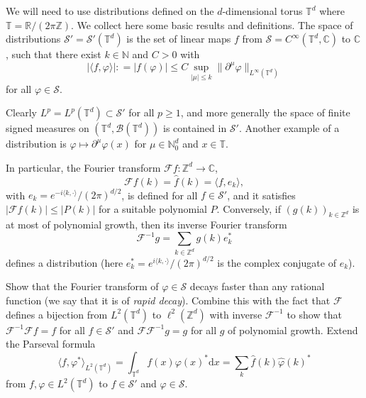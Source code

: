 \documentclass[a4paper,11pt]{article}
\newcommand{\cdummy}{\cdot}
\newcommand{\mathd}{\mathrm{d}}
\newcommand{\tmtextit}[1]{{\itshape{#1}}}
\newcommand{\CB}{\mathscr{B}}
\newcommand{\CF}{\mathscr{F}}
\newcommand{\CS}{\mathscr{S}}
\begin{document}
We will need to use distributions defined on the $d$-dimensional torus $\mathbb{T}^d$ where $\mathbb{T}=\mathbb{R}/ (2 \pi \mathbb{Z})$. We collect here some basic results and definitions. The space of distributions $\CS' = \CS' (\mathbb{T}^d)$ is the set of linear
maps $f$ from $\CS = C^{\infty} (\mathbb{T}^d, \mathbb{C})$ to
$\mathbb{C}$, such that there exist $k \in \mathbb{N}$ and $C > 0$ with
\[ | \langle f, \varphi \rangle | : = | f (\varphi) | \leqslant C \sup_{|
   {\mu} | \leqslant k} \| \partial^{{\mu}} \varphi \|_{L^{\infty}
   (\mathbb{T}^d)} \]
for all $\varphi \in \CS$.

\begin{example}
  Clearly $L^p = L^p (\mathbb{T}^d) \subset \CS'$ for all $p \geqslant 1$,
  and more generally the space of finite signed measures on $(\mathbb{T}^d, \mathcal{\CB} (\mathbb{T}^d))$ is contained in
  $\CS'$. Another example of a distribution is $\varphi \mapsto
  \partial^{{\mu}} \varphi (x)$ for ${\mu} \in \mathbb{N}^d_0$ and $x
  \in \mathbb{T}$.
\end{example}

In particular, the Fourier transform $\CF f : \mathbb{Z}^d \rightarrow
\mathbb{C}$,
\[ \CF f (k) = \hat{f} (k) = \langle f, e_k \rangle, \]
with $e_k = e^{- i \langle k, \cdummy \rangle} / (2 \pi)^{d / 2}$, is defined
for all $f \in \CS'$, and it satisfies $| \CF f (k) | \leqslant | P
(k) |$ for a suitable polynomial $P$. Conversely, if $(g (k))_{k \in
\mathbb{Z}^d}$ is at most of polynomial growth, then its inverse Fourier
transform
\[ \CF^{- 1} g = \sum_{k \in \mathbb{Z}^d} g (k) e_k^{\ast} \]
defines a distribution (here $e_k^\ast = e^{i \langle k, \cdummy \rangle} / (2 \pi)^{d / 2}$ is the complex conjugate of $e_k$).

\begin{exercise}
  \label{exo:fourier inversion}Show that the Fourier transform of $\varphi \in
  \CS$ decays faster than any rational function (we say that it is of
  \tmtextit{rapid decay}). Combine this with the fact that $\CF$ defines a
  bijection from $L^2 (\mathbb{T}^d)$ to $\ell^2 (\mathbb{Z}^d)$ with
  inverse $\CF^{- 1}$ to show that $\CF^{- 1} \CF f = f$ for all $f \in \CS'$
  and $\CF \CF^{- 1} g = g$ for all $g$ of polynomial growth. Extend the
  Parseval formula
  \[ \langle f, \varphi^{\ast} \rangle_{L^2 (\mathbb{T}^d)} =
     \int_{\mathbb{T}^d} f (x) \varphi (x)^{\ast} \mathd x = \sum_k \hat{f} (k)
     \hat{\varphi} (k)^{\ast} \]
  from $f, \varphi \in L^2 (\mathbb{T}^d)$ to $f \in \CS'$ and $\varphi \in
  \CS$.
\end{exercise}
\end{document}
